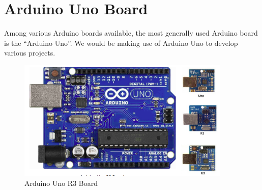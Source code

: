 \begin{figure}[htp]
\end{figure}
\section{Arduino Uno Board}
Among various Arduino boards available, the most generally used Arduino board is the “Arduino Uno”. We would be making use of Arduino Uno to develop various projects.\\

\begin{figure}
    \centering
    \includegraphics[width=4in]{Chapters/images/arduinor3.png}
    \caption{Arduino Uno R3 Board}
    \label{fig:my_label}
\end{figure}
